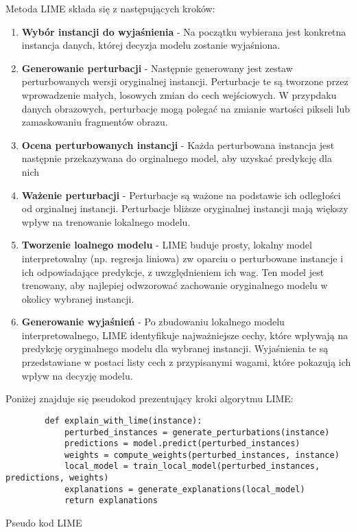 Metoda LIME składa się z następujących kroków:
\begin{enumerate}
	\item \textbf{Wybór instancji do wyjaśnienia} - Na początku wybierana jest konkretna instancja danych, której decyzja modelu zostanie  wyjaśniona.
	\item \textbf{Generowanie perturbacji} - Następnie generowany jest zestaw perturbowanych wersji oryginalnej instancji.
	      Perturbacje te są tworzone przez wprowadzenie małych, losowych zmian do cech wejściowych.
	      W przypdaku danych obrazowych, perturbacje mogą polegać na zmianie wartości pikseli lub zamaskowaniu fragmentów obrazu.
	\item \textbf{Ocena perturbowanych instancji} - Każda perturbowana instancja jest następnie przekazywana do orginalnego model, aby uzyskać predykcję dla nich
	\item \textbf{Ważenie perturbacji} - Perturbacje są ważone na podstawie ich odległości od orginalnej instancji.
	      Perturbacje bliższe oryginalnej instancji mają większy wpływ na trenowanie lokalnego modelu.
	\item \textbf{Tworzenie loalnego modelu} - LIME buduje prosty, lokalny model interpretowalny (np. regresja liniowa) zw oparciu o perturbowane instancje i ich odpowiadające predykcje, z uwzględnieniem ich wag.
	      Ten model jest trenowany, aby najlepiej odwzorować zachowanie oryginalnego modelu w okolicy wybranej instancji.
	\item \textbf{Generowanie wyjaśnień} - Po zbudowaniu lokalnego modelu interpretowalnego, LIME identyfikuje najważniejsze cechy, które wpływają na predykcję oryginalnego modelu dla wybranej instancji.
	      Wyjaśnienia te są przedstawiane w postaci listy cech z przypisanymi wagami, które pokazują ich wpływ na decyzję modelu.
\end{enumerate}

Poniżej znajduje się pseudokod prezentujący kroki algorytmu LIME:
\begin{listing}
	\begin{verbatim}
        def explain_with_lime(instance):
            perturbed_instances = generate_perturbations(instance)
            predictions = model.predict(perturbed_instances)
            weights = compute_weights(perturbed_instances, instance)
            local_model = train_local_model(perturbed_instances, predictions, weights)
            explanations = generate_explanations(local_model)
            return explanations
  \end{verbatim}
	\caption{Pseudo kod LIME} \label{listing:lime}
\end{listing}

